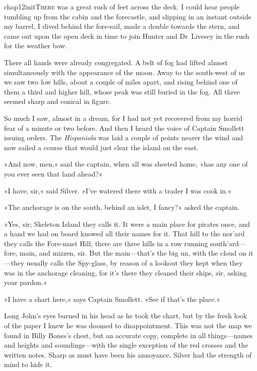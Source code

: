 
\lettrine[lines=5,image=true,findent=2pt]{chap12initT}{here} was a great rush of feet across the deck. I could hear people tumbling up from the cabin and the forecastle, and slipping in an instant outside my barrel, I dived behind the fore-sail, made a double towards the stern, and came out upon the open deck in time to join Hunter and Dr~Livesey in the rush for the weather bow.

There all hands were already congregated. A belt of fog had lifted almost simultaneously with the appearance of the moon. Away to the south-west of us we saw two low hills, about a couple of miles apart, and rising behind one of them a third and higher hill, whose peak was still buried in the fog. All three seemed sharp and conical in figure.

So much I saw, almost in a dream, for I had not yet recovered from my horrid fear of a minute or two before. And then I heard the voice of Captain Smollett issuing orders. The \textit{Hispaniola} was laid a couple of points nearer the wind and now sailed a course that would just clear the island on the east.

»And now, men,« said the captain, when all was sheeted home, »has any one of you ever seen that land ahead?«

»I have, sir,« said Silver. »I've watered there with a trader I was cook in.«

»The anchorage is on the south, behind an islet, I fancy?« asked the captain.

»Yes, sir; Skeleton Island they calls it. It were a main place for pirates once, and a hand we had on board knowed all their names for it. That hill to the nor'ard they calls the Fore-mast Hill; there are three hills in a row running south'ard—fore, main, and mizzen, sir. But the main—that's the big un, with the cloud on it—they usually calls the Spy-glass, by reason of a lookout they kept when they was in the anchorage cleaning, for it's there they cleaned their ships, sir, asking your pardon.«

»I have a chart here,« says Captain Smollett. »See if that's the place.«

Long John's eyes burned in his head as he took the chart, but by the fresh look of the paper I knew he was doomed to disappointment. This was not the map we found in Billy Bones's chest, but an accurate copy, complete in all things—names and heights and soundings—with the single exception of the red crosses and the written notes. Sharp as must have been his annoyance, Silver had the strength of mind to hide it.

